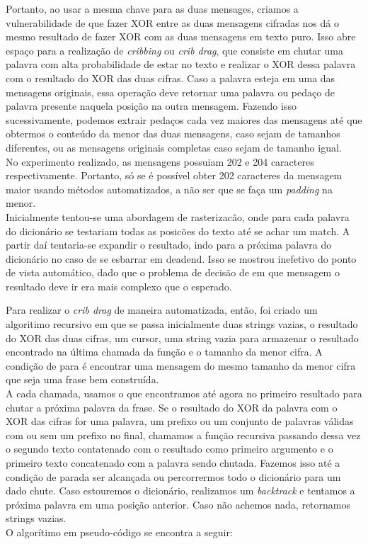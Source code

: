 \documentclass[10pt]{article}
\begin{document}
        Portanto, ao usar a mesma chave para as duas mensages, criamos a vulnerabilidade de que fazer XOR entre as duas 
        mensagens cifradas nos dá o mesmo resultado de fazer XOR com as duas mensagens em texto puro. Isso abre espaço 
        para a realização de \textit{cribbing} ou \textit{crib drag}, que consiste em chutar uma palavra com alta probabilidade
        de estar no texto e realizar o XOR dessa palavra com o resultado do XOR das duas cifras. Caso a palavra esteja em uma
        das mensagens originais, essa operação deve retornar uma palavra ou pedaço de palavra presente naquela posição na
        outra mensagem. Fazendo isso sucessivamente, podemos extrair pedaços cada vez maiores das mensagens até que obtermos
        o conteúdo da menor das duas mensagens, caso sejam de tamanhos diferentes, ou as mensagens originais completas caso
        sejam de tamanho igual. \\

        No experimento realizado, as mensagens possuiam 202 e 204 caracteres respectivamente. Portanto, só se é possível
        obter 202 caracteres da mensagem maior usando métodos automatizados, a não ser que se faça um \textit{padding} na
        menor. \\

        Inicialmente tentou-se uma abordagem de rasterizacão, onde para cada palavra do dicionário se testariam todas as posicões do texto até se achar um match. A partir daí tentaria-se expandir o resultado, indo para a próxima palavra do dicionário no caso de se esbarrar em deadend. Isso se mostrou inefetivo do ponto de vista automático, dado que o problema de decisão de em que mensagem o resultado deve ir era mais complexo que o esperado.

        Para realizar o \textit{crib drag} de maneira automatizada, então, foi criado um algoritimo recursivo em que se passa inicialmente duas strings vazias, o resultado do XOR das duas cifras, um cursor, uma string vazia para armazenar o resultado encontrado na última chamada da função e o tamanho da menor cifra. A condição de para é encontrar uma mensagem do mesmo tamanho da menor cifra que seja uma frase bem construída. \\

        A cada chamada, usamos o que encontramos até agora no primeiro resultado para chutar a próxima palavra da frase. Se o resultado do XOR da palavra com o XOR das cifras for uma palavra, um prefixo ou um conjunto de palavras válidas com ou sem um prefixo no final, chamamos a função recursiva passando dessa vez o segundo texto contatenado com o resultado como primeiro argumento e o primeiro texto concatenado com a palavra sendo chutada. Fazemos isso até a condição de parada ser alcançada ou percorrermos todo o dicionário para um dado chute. Caso estouremos o dicionário, realizamos um \textit{backtrack} e tentamos a próxima palavra em uma posição anterior. Caso não achemos nada, retornamos strings vazias. \\
        \newpage
        O algorítimo em pseudo-código se encontra a seguir:
\end{document}
